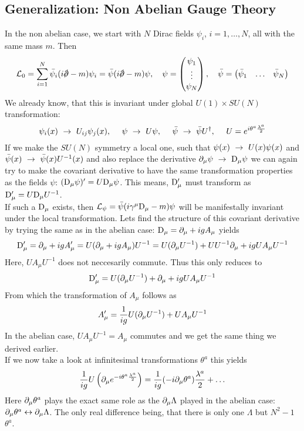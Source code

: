 \subsection{Generalization: Non Abelian Gauge Theory}
In the non abelian case, we start with $N$ Dirac fields $\psi_i$, $i = 1, \ldots, N$, all with the same mass $m$. Then
\[ \LL_0 = \sum_{i = 1}^N \bar{\psi}_i ( i \slashed{\p} - m ) \psi_i = \bar{\psi}( i \slashed{\p}- m) \psi, ~~~ \psi = \vektor{\psi_1}{\vdots}{\psi_N}, ~~~ \bar{\psi} = \begin{pmatrix}\bar{\psi}_1 & \ldots & \bar{\psi}_N\end{pmatrix}\]
We already know, that this is invariant under global $U(1)\times SU(N)$ transformation:
\[ \psi_i(x) ~\rightarrow~ U_{ij} \psi_j(x), ~~~~ \psi ~\rightarrow~ U \psi, ~~~~ \bar{\psi}~\rightarrow~\bar{\psi}U^\dagger, ~~~~ U = e^{i \theta^a \frac{\lambda^a}{2}}
\]
If we make the $SU(N)$ symmetry a local one, such that $\psi(x) ~\rightarrow~ U(x) \psi(x)$ and $\bar{\psi}(x) ~\rightarrow~\bar{\psi}(x) U^{-1}(x)$ and also replace the derivative $\partial_\mu \psi ~\rightarrow~ {\rm D}_\mu \psi$ we can again try to make the covariant derivative to have the same transformation properties as the fields $\psi$: $({\rm D}_\mu \psi)' = U {\rm D}_\mu \psi$. This means, ${\rm D}'_\mu$ must transform as ${\rm D}'_\mu = U {\rm D}_\mu U^{-1}$.\\
If such a ${\rm D}_\mu$ exists, then $\mathcal{L}_\psi = \bar{\psi}(i \gamma^\mu {\rm D}_\mu - m ) \psi$ will be manifestally invariant under the local transformation. Lets find the structure of this covariant derivative by trying the same as in the abelian case:
${\rm D}_\mu = \partial_\mu + i g A_\mu$ yields
\[{\rm D}'_\mu = \partial_\mu + i g A'_\mu = U(\partial_\mu + i gA_\mu) U^{-1} = U( \partial_\mu U^{-1}) + UU^{-1} \partial_\mu + i g U A_\mu U^{-1}\]
Here, $U A_\mu U^{-1}$ does not neccesarily commute. Thus this only reduces to
\[ {\rm D}'_\mu = U(\partial_\mu U^{-1}) + \partial_\mu + i g U A_\mu U^{-1}\]
From which the transformation of $A_\mu$ follows as
\[ A'_\mu = \frac{1}{ig} U( \partial_\mu U^{-1} )+ U A_\mu U^{-1}\]
In the abelian case, $U A_\mu U^{-1} = A_\mu$ commutes and we get the same thing we derived earlier.\\
If we now take a look at infinitesimal transformations $\theta^a$ this yields
\[ \frac{1}{ig} U \left( \partial_\mu e^{-i \theta^a \frac{\lambda^a}{2}}\right) = \frac{1}{ig} ( -i \partial_\mu \theta^a) \frac{\lambda^a}{2} + \ldots\]
Here $\partial_\mu \theta^a$ plays the exact same role as the $\partial_\mu \Lambda$ played in the abelian case: $\partial_\mu \theta^a \leftrightarrow \partial_\mu \Lambda$. The only real difference being, that there is only one $\Lambda$ but $N^2 -1$ $\theta^a$.\\
